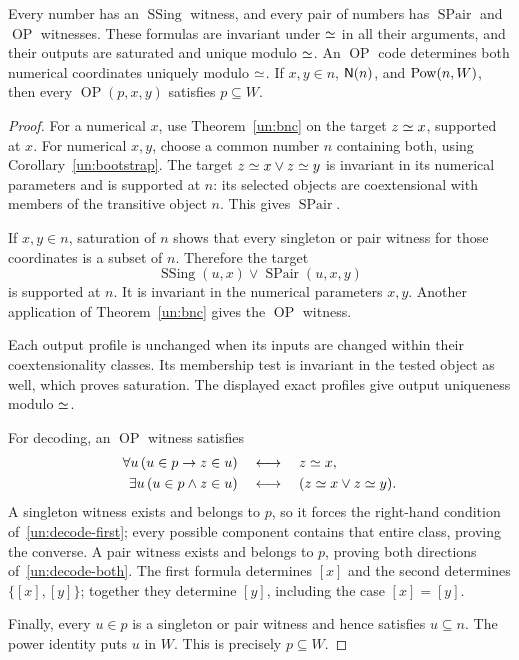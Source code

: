 \begin{lemma}\label{un:codes}
Every number has an $\operatorname{SSing}$ witness, and every pair of
numbers has $\operatorname{SPair}$ and $\operatorname{OP}$ witnesses.
These formulas are invariant under $\mathrel{\simeq}$ in all their arguments, and
their outputs are saturated and unique modulo $\mathrel{\simeq}$. An
$\operatorname{OP}$ code determines both numerical coordinates uniquely
modulo $\mathrel{\simeq}$. If $x,y\in n$, $\mathsf{N}(n)$, and $\operatorname{Pow}(n,W)$, then every
$\operatorname{OP}(p,x,y)$ satisfies $p\subseteq W$.
\end{lemma}
\begin{proof}
For a numerical $x$, use Theorem~\ref{un:bnc} on the target
$z\mathrel{\simeq} x$, supported at $x$. For numerical $x,y$, choose a common
number $n$ containing both, using Corollary~\ref{un:bootstrap}.
The target $z\mathrel{\simeq} x\lor z\mathrel{\simeq} y$ is invariant in its numerical
parameters and is supported at $n$: its selected objects are
coextensional with members of the transitive object $n$.
This gives $\operatorname{SPair}$.

If $x,y\in n$, saturation of $n$ shows that every singleton or pair
witness for those coordinates is a subset of $n$. Therefore the target
\[
             \operatorname{SSing}(u,x)\lor\operatorname{SPair}(u,x,y)
\]
is supported at $n$. It is invariant in the numerical parameters $x,y$.
Another application of Theorem~\ref{un:bnc} gives the
$\operatorname{OP}$ witness.

Each output profile is unchanged when its inputs are changed within
their coextensionality classes. Its membership test is invariant in the
tested object as well, which proves saturation. The displayed exact
profiles give output uniqueness modulo $\mathrel{\simeq}$.

For decoding, an $\operatorname{OP}$ witness satisfies
\begin{align}
 \forall u\,(u\in p\to z\in u)
       &\quad\longleftrightarrow\quad z\mathrel{\simeq} x,\label{un:decode-first}\\
 \exists u\,(u\in p\land z\in u)
       &\quad\longleftrightarrow\quad(z\mathrel{\simeq} x\lor z\mathrel{\simeq} y).
                                                        \label{un:decode-both}
\end{align}
A singleton witness exists and belongs to $p$, so it forces the
right-hand condition of~\eqref{un:decode-first}; every possible
component contains that entire class, proving the converse.
A pair witness exists and belongs to $p$, proving both directions
of~\eqref{un:decode-both}. The first formula determines $[x]$ and
the second determines $\{[x],[y]\}$; together they determine $[y]$,
including the case $[x]=[y]$.

Finally, every $u\in p$ is a singleton or pair witness and hence
satisfies $u\subseteq n$. The power identity puts $u$ in $W$.
This is precisely $p\subseteq W$.
\end{proof}

